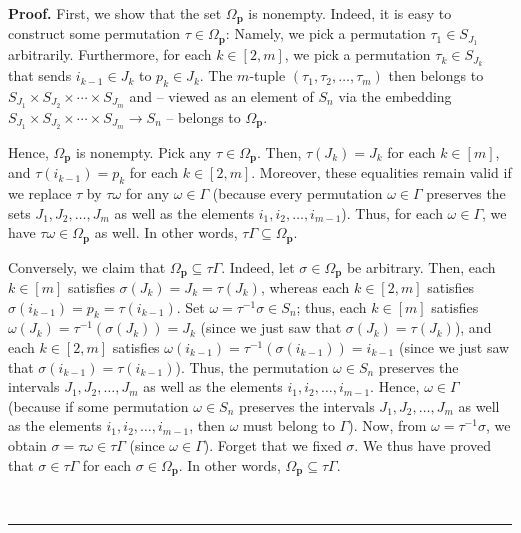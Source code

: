 \documentclass[numbers=enddot,12pt,final,onecolumn,notitlepage]{scrartcl}%
\theoremstyle{definition}
\newenvironment{proof}[1][Proof]{\noindent\textbf{#1.} }{\ \rule{0.5em}{0.5em}}
\begin{document}
\begin{proof}
First, we show that the set $\Omega_{\mathbf{p}}$ is nonempty. Indeed, it is
easy to construct some permutation $\tau\in\Omega_{\mathbf{p}}$: Namely, we
pick a permutation $\tau_{1}\in S_{J_{1}}$ arbitrarily. Furthermore, for each
$k\in\left[  2,m\right]  $, we pick a permutation $\tau_{k}\in S_{J_{k}}$ that
sends $i_{k-1}\in J_{k}$ to $p_{k}\in J_{k}$. The $m$-tuple $\left(  \tau
_{1},\tau_{2},\ldots,\tau_{m}\right)  $ then belongs to $S_{J_{1}}\times
S_{J_{2}}\times\cdots\times S_{J_{m}}$ and -- viewed as an element of $S_{n}$
via the embedding $S_{J_{1}}\times S_{J_{2}}\times\cdots\times S_{J_{m}%
}\rightarrow S_{n}$ -- belongs to $\Omega_{\mathbf{p}}$.

Hence, $\Omega_{\mathbf{p}}$ is nonempty. Pick any $\tau\in\Omega_{\mathbf{p}%
}$. Then, $\tau\left(  J_{k}\right)  =J_{k}$ for each $k\in\left[  m\right]
$, and $\tau\left(  i_{k-1}\right)  =p_{k}$ for each $k\in\left[  2,m\right]
$. Moreover, these equalities remain valid if we replace $\tau$ by $\tau
\omega$ for any $\omega\in\Gamma$ (because every permutation $\omega\in\Gamma$
preserves the sets $J_{1},J_{2},\ldots,J_{m}$ as well as the elements
$i_{1},i_{2},\ldots,i_{m-1}$). Thus, for each $\omega\in\Gamma$, we have
$\tau\omega\in\Omega_{\mathbf{p}}$ as well. In other words, $\tau
\Gamma\subseteq\Omega_{\mathbf{p}}$.

Conversely, we claim that $\Omega_{\mathbf{p}}\subseteq\tau\Gamma$. Indeed,
let $\sigma\in\Omega_{\mathbf{p}}$ be arbitrary. Then, each $k\in\left[
m\right]  $ satisfies $\sigma\left(  J_{k}\right)  =J_{k}=\tau\left(
J_{k}\right)  $, whereas each $k\in\left[  2,m\right]  $ satisfies
$\sigma\left(  i_{k-1}\right)  =p_{k}=\tau\left(  i_{k-1}\right)  $. Set
$\omega=\tau^{-1}\sigma\in S_{n}$; thus, each $k\in\left[  m\right]  $
satisfies $\omega\left(  J_{k}\right)  =\tau^{-1}\left(  \sigma\left(
J_{k}\right)  \right)  =J_{k}$ (since we just saw that $\sigma\left(
J_{k}\right)  =\tau\left(  J_{k}\right)  $), and each $k\in\left[  2,m\right]
$ satisfies $\omega\left(  i_{k-1}\right)  =\tau^{-1}\left(  \sigma\left(
i_{k-1}\right)  \right)  =i_{k-1}$ (since we just saw that $\sigma\left(
i_{k-1}\right)  =\tau\left(  i_{k-1}\right)  $). Thus, the permutation
$\omega\in S_{n}$ preserves the intervals $J_{1},J_{2},\ldots,J_{m}$ as well
as the elements $i_{1},i_{2},\ldots,i_{m-1}$. Hence, $\omega\in\Gamma$
(because if some permutation $\omega\in S_{n}$ preserves the intervals
$J_{1},J_{2},\ldots,J_{m}$ as well as the elements $i_{1},i_{2},\ldots
,i_{m-1}$, then $\omega$ must belong to $\Gamma$). Now, from $\omega=\tau
^{-1}\sigma$, we obtain $\sigma=\tau\omega\in\tau\Gamma$ (since $\omega
\in\Gamma$). Forget that we fixed $\sigma$. We thus have proved that
$\sigma\in\tau\Gamma$ for each $\sigma\in\Omega_{\mathbf{p}}$. In other words,
$\Omega_{\mathbf{p}}\subseteq\tau\Gamma$.


\end{proof}
\end{document}
